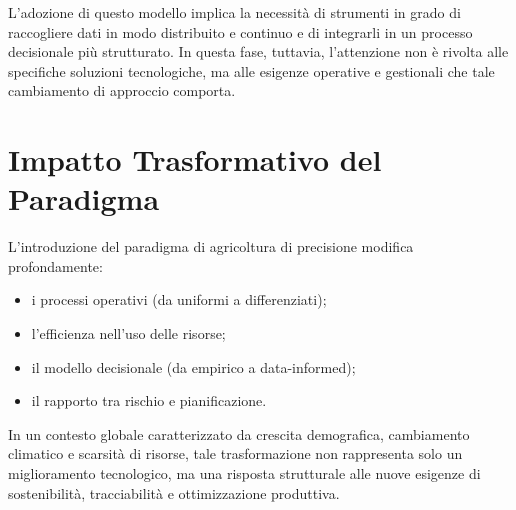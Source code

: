 L’adozione di questo modello implica la necessità di strumenti in grado di raccogliere dati in modo distribuito e continuo e di integrarli in un processo decisionale più strutturato. In questa fase, tuttavia, l’attenzione non è rivolta alle specifiche soluzioni tecnologiche, ma alle esigenze operative e gestionali che tale cambiamento di approccio comporta.



\section{Impatto Trasformativo del Paradigma}
L’introduzione del paradigma di agricoltura di precisione modifica profondamente:
\begin{itemize}
	\item i processi operativi (da uniformi a differenziati);
	\item l'efficienza nell'uso delle risorse;
	\item il modello decisionale (da empirico a data-informed);
	\item il rapporto tra rischio e pianificazione.
\end{itemize}

\noindent In un contesto globale caratterizzato da crescita demografica, cambiamento climatico e scarsità di risorse, tale trasformazione non rappresenta solo un miglioramento tecnologico, ma una risposta strutturale alle nuove esigenze di sostenibilità, tracciabilità e ottimizzazione produttiva.